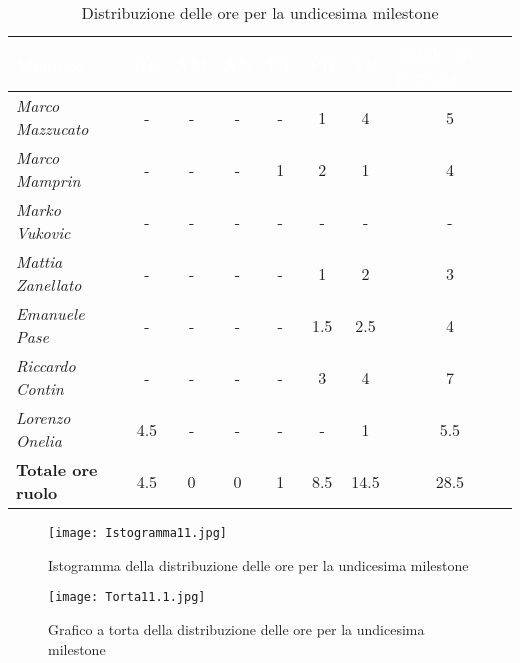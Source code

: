 \begin{table}[H]
    \renewcommand\arraystretch{1.5}
    \centering
    \begin{tabular}{|l|c|c|c|c|c|c|c|}
    \hline
    \rowcolor[HTML]{036400}
    \textcolor{white}{\textbf{Membro}} & \multicolumn{1}{l|}{\textcolor{white}{\textbf{RE}}} & \multicolumn{1}{l|}{\textcolor{white}{\textbf{AM}}} & \multicolumn{1}{l|}{\textcolor{white}{\textbf{AN}}} & \multicolumn{1}{l|}{\textcolor{white}{\textbf{PT}}} & \multicolumn{1}{l|}{\textcolor{white}{\textbf{PR}}} & \multicolumn{1}{l|}{\textcolor{white}{\textbf{VE}}} & \multicolumn{1}{l|}{\textcolor{white}{\textbf{Totale ore persona}}} \\ \hline
    \rowcolor[HTML]{EFEFEF}\textit{Marco Mazzucato}  & -   & -   & -  & -    & 1    & 4      & 5     \\ \hline
    \rowcolor[HTML]{C0C0C0}\textit{Marco Mamprin}    & -   & -   & -  & 1    & 2    & 1      & 4     \\ \hline
    \rowcolor[HTML]{EFEFEF}\textit{Marko Vukovic}    & -   & -   & -  & -    & -    & -      & -     \\ \hline
    \rowcolor[HTML]{C0C0C0}\textit{Mattia Zanellato} & -   & -   & -  & -    & 1    & 2      & 3     \\ \hline
    \rowcolor[HTML]{EFEFEF}\textit{Emanuele Pase}    & -   & -   & -  & -    & 1.5  & 2.5    & 4     \\ \hline
    \rowcolor[HTML]{C0C0C0}\textit{Riccardo Contin}  & -   & -   & -  & -    & 3    & 4      & 7     \\ \hline
    \rowcolor[HTML]{EFEFEF}\textit{Lorenzo Onelia}   & 4.5 & -   & -  & -    & -    & 1      & 5.5    \\ \hline
    \rowcolor[HTML]{C0C0C0}\textbf{Totale ore ruolo} & 4.5 & 0   & 0  & 1    & 8.5  & 14.5   & 28.5    \\ \hline
    \end{tabular}
    \caption{Distribuzione delle ore per la undicesima milestone}
\end{table}

\begin{figure}[H]
    \texttt{[image: Istogramma11.jpg]}
    \caption{Istogramma della distribuzione delle ore per la undicesima milestone}
\end{figure}

\begin{figure}[H]
    \texttt{[image: Torta11.1.jpg]}
    \caption{Grafico a torta della distribuzione delle ore per la undicesima milestone}
\end{figure}

